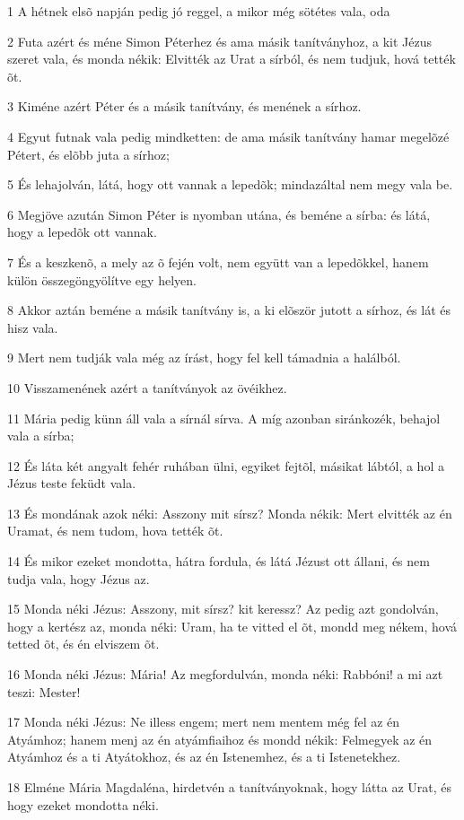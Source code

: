 \par 1 A hétnek elsõ napján pedig jó reggel, a mikor még sötétes vala, oda
\par 2 Futa azért és méne Simon Péterhez és ama másik tanítványhoz, a kit Jézus szeret vala, és monda nékik: Elvitték az Urat a sírból, és nem tudjuk, hová tették õt.
\par 3 Kiméne azért Péter és a másik tanítvány, és menének a sírhoz.
\par 4 Egyut futnak vala pedig mindketten: de ama másik tanítvány hamar megelõzé Pétert, és elõbb juta a sírhoz;
\par 5 És lehajolván, látá, hogy ott vannak a lepedõk; mindazáltal nem megy vala be.
\par 6 Megjöve azután Simon Péter is nyomban utána, és beméne a sírba: és látá, hogy a lepedõk ott vannak.
\par 7 És a keszkenõ, a mely az õ fején volt, nem együtt van a lepedõkkel, hanem külön összegöngyölítve egy helyen.
\par 8 Akkor aztán beméne a másik tanítvány is, a ki elõször jutott a sírhoz, és lát és hisz vala.
\par 9 Mert nem tudják vala még az írást, hogy fel kell támadnia a halálból.
\par 10 Visszamenének azért a tanítványok az övéikhez.
\par 11 Mária pedig künn áll vala a sírnál sírva. A míg azonban siránkozék, behajol vala a sírba;
\par 12 És láta két angyalt fehér ruhában ülni, egyiket fejtõl, másikat lábtól, a hol a Jézus teste feküdt vala.
\par 13 És mondának azok néki: Asszony mit sírsz? Monda nékik: Mert elvitték az én Uramat, és nem tudom, hova tették õt.
\par 14 És mikor ezeket mondotta, hátra fordula, és látá Jézust ott állani, és nem tudja vala, hogy Jézus az.
\par 15 Monda néki Jézus: Asszony, mit sírsz? kit keressz? Az pedig azt gondolván, hogy a kertész az, monda néki: Uram, ha te vitted el õt, mondd meg nékem, hová tetted õt, és én elviszem õt.
\par 16 Monda néki Jézus: Mária! Az megfordulván, monda néki: Rabbóni! a mi azt teszi: Mester!
\par 17 Monda néki Jézus: Ne illess engem; mert nem mentem még fel az én Atyámhoz; hanem menj az én atyámfiaihoz és mondd nékik: Felmegyek az én Atyámhoz és a ti Atyátokhoz, és az én Istenemhez, és a ti Istenetekhez.
\par 18 Elméne Mária Magdaléna, hirdetvén a tanítványoknak, hogy látta az Urat, és hogy ezeket mondotta néki.
